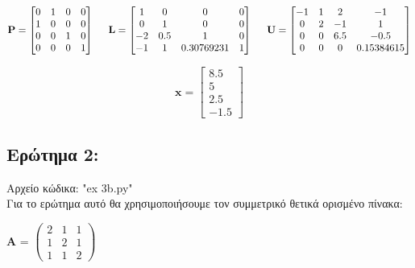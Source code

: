 \documentclass{article}
\begin{document}
\begin{equation*}
    \textbf{P}  =
    \begin{bmatrix}
        0 & 1 & 0 & 0\\
        1 & 0 & 0 & 0\\
        0 & 0 & 1 & 0\\
        0 & 0 & 0 & 1
    \end{bmatrix} \hspace{0.5cm}
    \textbf{L}  =  
    \begin{bmatrix}
        1 & 0 & 0 & 0\\
        0 & 1 & 0 & 0\\
        -2 & 0.5 & 1 & 0\\
        -1 & 1 & 0.30769231 & 1
    \end{bmatrix} \hspace{0.5cm}
    \textbf{U}  = 
    \begin{bmatrix}
        -1 & 1 & 2 & -1\\
        0 & 2 & -1 & 1\\
        0 & 0 & 6.5 & -0.5\\
        0 & 0 & 0 & 0.15384615
    \end{bmatrix}
\end{equation*}  

\begin{equation*}
    \textbf{x} = 
    \begin{bmatrix}
        8.5\\
        5\\
        2.5\\
        -1.5
    \end{bmatrix}
\end{equation*}

\subsection{Ερώτημα 2:}

Αρχείο κώδικα: "ex 3b.py" \\

Για το ερώτημα αυτό θα χρησιμοποιήσουμε τον συμμετρικό θετικά ορισμένο πίνακα: \\

\begin{center}
\textbf{A} =
$\begin{pmatrix}
2 & 1 & 1\\
1 & 2 & 1\\
1 & 1 & 2
\end{pmatrix}$
\end{center}
\end{document}
